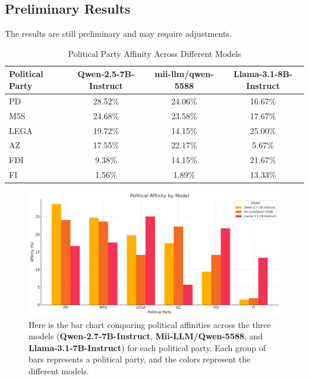 \documentclass{article}
\begin{document}
\subsection*{Preliminary Results}

The results are still preliminary and may require adjustments.
\begin{table}[h]
    \centering
    \renewcommand{\arraystretch}{1.2}
    \begin{tabular}{|l|c|c|c|}
        \hline
        \textbf{Political Party} & \textbf{Qwen-2.5-7B-Instruct} & \textbf{mii-llm/qwen-5588} & \textbf{Llama-3.1-8B-Instruct} \\
        \hline
        PD   & 28.52\% & 24.06\% & 16.67\% \\
        M5S  & 24.68\% & 23.58\% & 17.67\% \\
        LEGA & 19.72\% & 14.15\% & 25.00\% \\
        AZ   & 17.55\% & 22.17\% & 5.67\%  \\
        FDI  & 9.38\%  & 14.15\% & 21.67\% \\
        FI   & 1.56\%  & 1.89\%  & 13.33\% \\
        \hline
    \end{tabular}
    \caption{Political Party Affinity Across Different Models}
    \label{tab:affinity_comparison}
\end{table}

\begin{figure}[h!]
    \centering
    \includegraphics[width=\textwidth]{political_affinity.png}
    \caption{Here is the bar chart comparing political affinities across the three models (\textbf{Qwen-2.7-7B-Instruct}, \textbf{Mii-LLM/Qwen-5588}, and \textbf{Llama-3.1-7B-Instruct}) for each political party. Each group of bars represents a political party, and the colors represent the different models.}
    \label{fig:political_affinity}
\end{figure}
\end{document}
